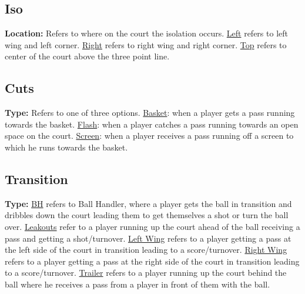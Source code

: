 \documentclass[a4paper,12pt]{article}
\begin{document}
\vspace{.5em}

\subsection*{Iso}

    \noindent \textbf{Location:} Refers to where on the court the isolation occurs. \underline{Left} refers to left wing and left corner. \underline{Right} refers to right wing and right corner. \underline{Top} refers to center of the court above the three point line.

\vspace{.5em}

\subsection*{Cuts}

    \noindent \textbf{Type:} Refers to one of three options. \underline{Basket}: when a player gets a pass running towards the basket. \underline{Flash}: when a player catches a pass running towards an open space on the court. \underline{Screen}: when a player receives a pass running off a screen to which he runs towards the basket. 
    
\vspace{.5em}

\subsection*{Transition}

    \noindent \textbf{Type:} \underline{BH} refers to Ball Handler, where a player gets the ball in transition and dribbles down the court leading them to get themselves a shot or turn the ball over. \underline{Leakouts} refer to a player running up the court ahead of the ball receiving a pass and getting a shot/turnover. \underline{Left Wing} refers to a player getting a pass at the left side of the court in transition leading to a score/turnover. \underline{Right Wing} refers to a player getting a pass at the right side of the court in transition leading to a score/turnover. \underline{Trailer} refers to a player running up the court behind the ball where he receives a pass from a player in front of them with the ball. 

\clearpage
\end{document}
